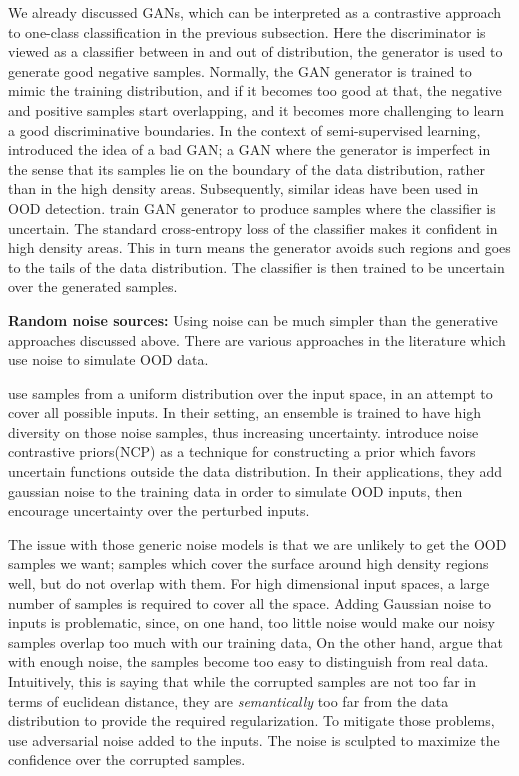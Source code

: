\documentclass[../main.tex]{subfiles}
\begin{document}
We already discussed GANs, which can be interpreted as a contrastive approach to one-class classification in the previous subsection. Here the discriminator is viewed as a classifier between in and out of distribution, the generator is used to generate good negative samples. Normally, the GAN generator is trained to mimic the training distribution, and if it becomes too good at that, the negative and positive samples start overlapping, and it becomes more challenging to learn a good discriminative boundaries. In the context of semi-supervised learning, \citep{dai2017good} introduced the idea of a bad GAN; a GAN where the generator is imperfect in the sense that its samples lie on the boundary of the data distribution, rather than in the high density areas. Subsequently, similar ideas have been used in OOD detection. \cite{lee2017training} train GAN generator to produce samples where the classifier is uncertain. The standard cross-entropy loss of the classifier makes it confident in high density areas. This in turn means the generator avoids such regions and goes to the tails of the data distribution. The classifier is then trained to be uncertain over the generated samples. 

\textbf{Random noise sources:} Using noise can be much simpler than the generative approaches discussed above. There are various approaches in the literature which use noise to  simulate OOD data. 

\cite{jain2019maximizing} use samples from a uniform distribution over the input space, in an attempt to cover all possible inputs. In their setting, an ensemble is trained to have high diversity on those noise samples, thus increasing uncertainty. \citet{Hafner2018NoiseCP} introduce noise contrastive priors(NCP) as a technique for constructing a prior which favors uncertain functions outside the data distribution. In their applications, they add gaussian noise to the training data in order to simulate OOD inputs, then encourage uncertainty over the perturbed inputs.

The issue with those generic noise models is that we are unlikely to get the OOD samples we want; samples which cover the surface around high density regions well, but do not overlap with them. For high dimensional input spaces, a large number of samples is required to cover all the space. Adding Gaussian noise to inputs is problematic, since, on one hand, too little noise would make our noisy samples overlap too much with our training data, On the other hand, \cite{csiszarik2019negative} argue that with enough noise, the samples become too easy to distinguish from real data. Intuitively, this is saying that while the corrupted samples are not too far in terms of euclidean distance, they are \emph{semantically} too far from the data distribution to provide the required regularization. To mitigate those problems, \cite{hein2019relu} use adversarial noise added to the inputs. The noise is sculpted to maximize the confidence over the corrupted samples.
\end{document}
